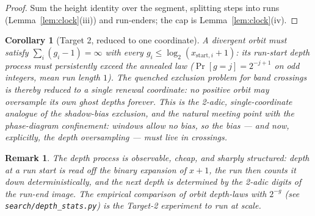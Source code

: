 \documentclass[11pt]{article}
\newtheorem{corollary}{Corollary}
\newtheorem*{remark}{Remark}
\begin{document}
\begin{proof}
Sum the height identity over the segment, splitting steps into runs
(Lemma~\ref{lem:clock}(iii)) and run-enders; the cap is
Lemma~\ref{lem:clock}(iv).
\end{proof}

\begin{corollary}[Target 2, reduced to one coordinate]
A divergent orbit must satisfy
$\sum_i(g_i-1)=\infty$ with every $g_i\le\log_2(x_{\mathrm{start},i}+1)$:
its run-start depth process must persistently exceed the
annealed law ($\Pr[g=j]=2^{-j+1}$ on odd integers, mean run length $1$).
The quenched exclusion problem for band crossings is thereby reduced to a
single renewal coordinate: \emph{no positive orbit may oversample its own
ghost depths forever}. This is the 2-adic, single-coordinate analogue of
the shadow-bias exclusion, and the natural meeting point with the
phase-diagram confinement: windows allow no bias, so the bias --- and now,
explicitly, the depth oversampling --- must live in crossings.
\end{corollary}

\begin{remark}
The depth process is observable, cheap, and sharply structured: depth at
a run start is read off the binary expansion of $x+1$, the run then
counts it down deterministically, and the next depth is determined by
the 2-adic digits of the run-end image. The empirical comparison of
orbit depth-laws with $2^{-g}$ (see \texttt{search/depth\_stats.py}) is
the Target-2 experiment to run at scale.
\end{remark}
\end{document}
